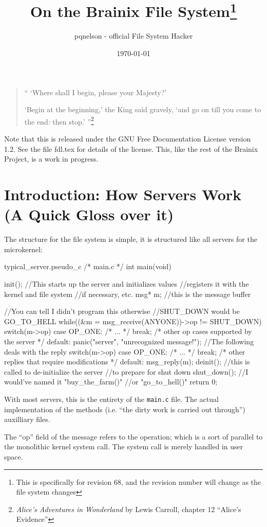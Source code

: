 \documentclass{article}
\title{On the Brainix File System\footnote{This is specifically for revision 68, and the revision number will change as the file system changes}}
\author{pqnelson - official File System Hacker}
\date{\today}
\begin{document}
 \maketitle
\begin{quote}
 `` `Where shall I begin, please your Majesty?' 

\indent `Begin at the beginning,' the King said gravely, `and go on till you come to the end: then stop.' ''\footnote{\textit{Alice's Adventures in Wonderland} by Lewis Carroll, chapter 12 ``Alice's Evidence''}
\end{quote}

Note that this is released under the GNU Free Documentation License version 1.2. See the file fdl.tex for details of the license. This, like the rest of the Brainix Project, is a work in progress.
\section{Introduction: How Servers Work (A Quick Gloss over it)}
The structure for the file system is simple, it is structured like all servers for the microkernel:
\begin{code}{typical\_server.pseudo\_c}
 /* main.c */
int main(void) {
     init(); //This starts up the server and initializes values
             //registers it with the kernel and file system
             //if necessary, etc.
     msg* m; //this is the message buffer

     //You can tell I didn't program this otherwise 
     //SHUT_DOWN would be GO_TO_HELL
     while((&m = msg_receive(ANYONE))->op != SHUT_DOWN) 
     {
          switch(m->op) {
               case OP_ONE: /* ... */ break;
               /* other op cases supported by the server */
               default: panic("server", "unrecognized message!");
          }
          //The following deals with the reply
          switch(m->op)
          {
               case OP_ONE: /* ... */ break;
               /* other replies that require modifications */
               default: msg_reply(m);
          }
     }
     deinit(); //this is called to de-initialize the server
               //to prepare for shut down
     shut_down(); //I would've named it "buy_the_farm()"
                  //or "go_to_hell()"
     return 0;
}
\end{code}
With most servers, this is the entirety of the \verb|main.c| file. The actual implementation of the methods (i.e. ``the dirty work is carried out through'') auxilliary files.

The ``op'' field of the message refers to the operation; which is a sort of parallel to the monolithic kernel system call. The system call is merely handled in user space.
\end{document}
